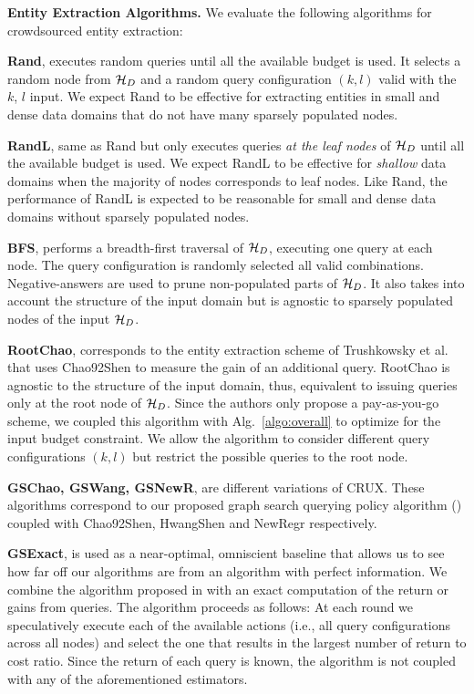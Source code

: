 \noindent\textbf{Entity Extraction Algorithms.} We evaluate the following algorithms for crowdsourced entity extraction:
\squishlist
\item {\bf Rand}, executes random queries until all the available budget is used. It selects a random node from $\mathcal{H}_D$ and a random query configuration $(k,l)$ valid with the $k$, $l$ input. \iftr We expect Rand to be effective for extracting entities in small and dense data domains that do not have many sparsely populated nodes. \fi
\item {\bf RandL}, same as Rand but only executes queries {\em at the leaf nodes} of $\mathcal{H}_D$ until all the available budget is used.  \iftr We expect RandL to be effective for {\em shallow} data domains when the majority of nodes corresponds to leaf nodes. Like Rand, the performance of RandL is expected to be reasonable for small and dense data domains without sparsely populated nodes.\fi
\item {\bf BFS}, performs a breadth-first traversal of $\mathcal{H}_D$, executing one query at each node. The query configuration is randomly selected all valid combinations. Negative-answers are used to prune non-populated parts of $\mathcal{H}_D$. \iftr It also takes into account the structure of the input domain but is agnostic to sparsely populated nodes of the input $\mathcal{H}_D$. \fi
\item {\bf RootChao}, corresponds to the entity extraction scheme of Trushkowsky et al.~\cite{trushkowsky:2013} that uses Chao92Shen to measure the gain of an additional query. RootChao is agnostic to the structure of the input domain, thus, equivalent to issuing queries only at the root node of $\mathcal{H}_D$. Since the authors only propose a pay-as-you-go scheme, we coupled this algorithm with Alg.~\ref{algo:overall} to optimize for the input budget constraint. We allow the algorithm to consider different query configurations $(k,l)$ but restrict the possible queries to the root node.
\item {\bf GSChao, GSWang, GSNewR}, are different variations of CRUX. These algorithms correspond to our proposed graph search querying policy algorithm () coupled with Chao92Shen, HwangShen and NewRegr respectively.
\item {\bf GSExact}, is used as a near-optimal, omniscient baseline that allows us to see how far off our algorithms are from an algorithm with perfect information. We combine the algorithm proposed in  with an exact computation of the return or gains from queries. The algorithm proceeds as follows: At each round we speculatively execute each of the available actions (i.e., all query configurations across all nodes) and select the one that results in the largest number of return to cost ratio. Since the return of each query is known, the algorithm is not coupled with any of the aforementioned estimators.
\squishend

